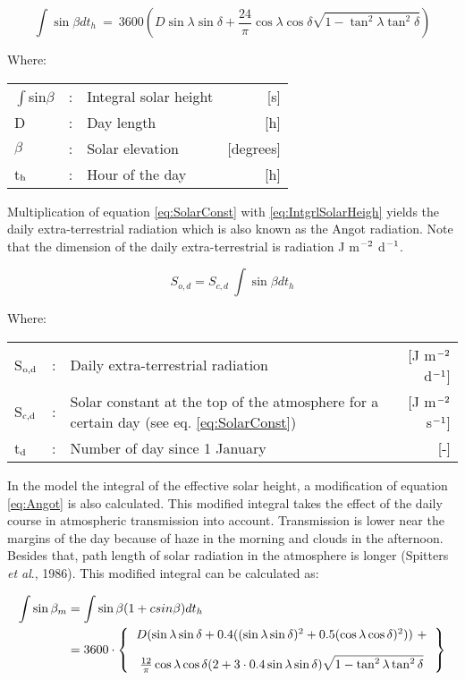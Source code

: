 \begin{equation}
\label{eq:IntgrlSolarHeigh}
\int \sin \beta dt _{h} ~=~ 3600( D \sin \lambda \sin \delta +{\frac{24}{\pi }} \cos \lambda \cos \delta \sqrt{1-\tan^{2} \lambda \tan^{2} \delta } )
\end{equation}

Where:\\[5pt]
\begin{tabularx}{\textwidth}{llXr}
	$\int$sin$\beta$  &:& Integral solar height & [s]\\
	D  &:& Day length & [h]\\
	$\beta$  &:& Solar elevation & [degrees]\\
	t$_{{\rm h}}$  &:& Hour of the day & [h]\\
\end{tabularx}

Multiplication of equation \ref{eq:SolarConst} with \ref{eq:IntgrlSolarHeigh} yields the 
daily extra-terrestrial radiation which is also known as the Angot radiation. Note that 
the dimension of the daily extra-terrestrial is radiation J m$^{{\rm -2}}$ d$^{{\rm -1}}$.

\begin{equation}
\label{eq:Angot}
S_{o,d} = S _{c,d} ~ \int \sin \beta dt _{h} 
\end{equation}

Where:\\[5pt]
\begin{tabularx}{\textwidth}{llXr}
	S$_{{\rm o,d}}$ &:& Daily extra-terrestrial radiation  & [J m$^{{\rm -2}}$ d$^{{\rm -1}}$]\\
	S$_{{\rm c,d}}$ &:& Solar constant at the top of the atmosphere 
	for a certain day (see eq. \ref{eq:SolarConst})  & [J m$^{{\rm -2}}$ s$^{{\rm -1}}$]\\
	t$_{{\rm d}}$ &:& Number of day since 1 January  & [-]\\
\end{tabularx}

In the model the integral of the effective solar height, a modification of equation \ref{eq:Angot} is
also calculated. This modified integral takes the effect of the daily course in atmospheric
transmis\-sion into account. Transmission is lower near the margins of the day because of
haze in the morning and clouds in the afternoon. Besides that, path length of solar
radiation in the atmosphere is longer (Spitters {\it et al}., 1986). This modified integral 
can be calculated as:

\begin{align}
\label{eq:IntSolarHeight}
\int \sin \beta_{m} &= \int \sin \beta (1+csin \beta ) dt_{h}  \\
&= 3600 \cdot \left \{
\begin{tabular}{c}
$D ( \sin \lambda \sin \delta + 0.4 
(( \sin \lambda \sin \delta )^{2} + 0.5( 
\cos \lambda \cos \delta ) ^{2} )) ~ + \nonumber$ \\[1em]
${\frac{12}{\pi}} \cos \lambda \cos 
\delta (2+3 \cdot 0.4 \sin \lambda \sin \delta ) 
\sqrt{1-\tan^{2} \lambda \tan^{2} \delta } \nonumber$
\end{tabular}
\right \}
\end{align}

